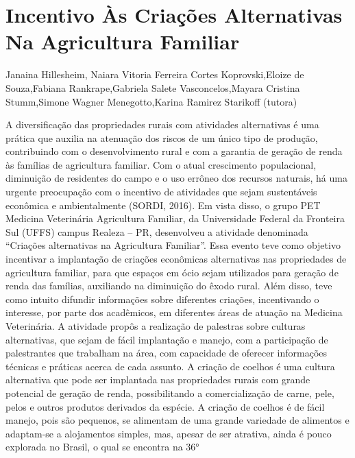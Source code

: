 


\section*{Incentivo Às Criações Alternativas Na Agricultura Familiar}

Janaina Hillesheim, Naiara Vitoria Ferreira Cortes Koprovski,Eloize de Souza,Fabiana Rankrape,Gabriela Salete Vasconcelos,Mayara Cristina Stumm,Simone Wagner Menegotto,Karina Ramirez Starikoff (tutora)

A diversificação das propriedades rurais com atividades alternativas é uma prática que
auxilia na atenuação dos riscos de um único tipo de produção, contribuindo com o
desenvolvimento rural e com a garantia de geração de renda às famílias de agricultura familiar.
Com o atual crescimento populacional, diminuição de residentes do campo e o uso errôneo dos
recursos naturais, há uma urgente preocupação com o incentivo de atividades que sejam
sustentáveis econômica e ambientalmente (SORDI, 2016).
Em vista disso, o grupo PET Medicina Veterinária Agricultura Familiar, da Universidade
Federal da Fronteira Sul (UFFS) campus Realeza – PR, desenvolveu a atividade denominada
“Criações alternativas na Agricultura Familiar”. Essa evento teve como objetivo incentivar a
implantação de criações econômicas alternativas nas propriedades de agricultura familiar, para
que espaços em ócio sejam utilizados para geração de renda das famílias, auxiliando na
diminuição do êxodo rural. Além disso, teve como intuito difundir informações sobre diferentes
criações, incentivando o interesse, por parte dos acadêmicos, em diferentes áreas de atuação na
Medicina Veterinária.
A atividade propôs a realização de palestras sobre culturas alternativas, que sejam de fácil
implantação e manejo, com a participação de palestrantes que trabalham na área, com capacidade
de oferecer informações técnicas e práticas acerca de cada assunto.
A criação de coelhos é uma cultura alternativa que pode ser implantada nas propriedades
rurais com grande potencial de geração de renda, possibilitando a comercialização de carne, pele,
pelos e outros produtos derivados da espécie. A criação de coelhos é de fácil manejo, pois são
pequenos, se alimentam de uma grande variedade de alimentos e adaptam-se a alojamentos
simples, mas, apesar de ser atrativa, ainda é pouco explorada no Brasil, o qual se encontra na 36°
